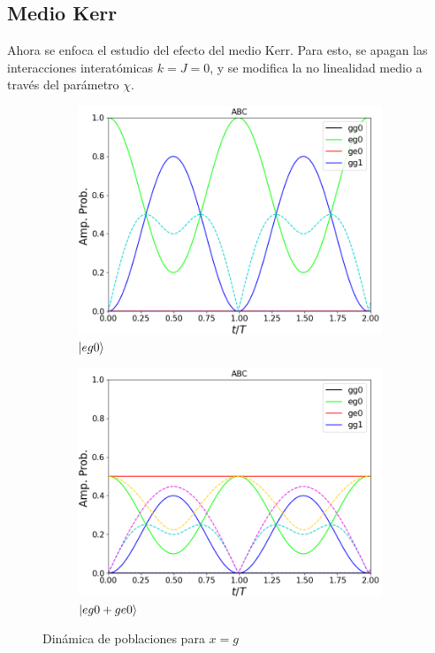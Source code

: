 \subsection{Medio Kerr}
\label{sec4:medio kerr}
Ahora se enfoca el estudio del efecto del medio Kerr. Para esto, se apagan las interacciones interatómicas $k=J=0$, y se modifica la no linealidad medio a través del parámetro $\chi$. 
\begin{figure}[h]
    \centering
    \begin{subfigure}{0.49\textwidth}
        \includegraphics[width=\textwidth]{figuras/ch4/x eg0 abc.png}
        \caption{$\ket{eg0}$}
        \label{fig4:pob x eg0}
    \end{subfigure}
    \hfill
    \begin{subfigure}{0.49\textwidth}
        \includegraphics[width=\textwidth]{figuras/ch4/x eg0+ abc.png}
        \caption{$\ket{eg0+ge0}$}
        \label{fig4:pob x eg0 sim}
    \end{subfigure}
    \caption{Dinámica de poblaciones para $x=g$}
    \label{fig4:pob x}
\end{figure}


